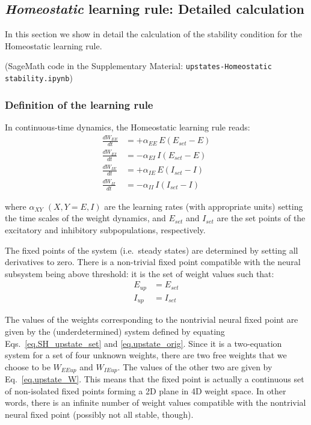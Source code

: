 \documentclass[twocolumn]{article}
\newcommand{\EE}{\mathit{EE}}
\newcommand{\EI}{\mathit{EI}}
\newcommand{\IE}{\mathit{IE}}
\newcommand{\II}{\mathit{II}}
\newcommand{\XY}{\mathit{XY}}
\newcommand{\set}{\mathit{set}}
\newcommand{\up}{\mathit{up}}
\begin{document}
\subsection{{\em Homeostatic} learning rule: Detailed calculation}
\label{sec.SH_details}

In this section we show in detail the calculation of the stability condition for the Homeostatic learning rule.

(SageMath code in the Supplementary Material: {\tt upstates-Homeostatic stability.ipynb})


\subsubsection{Definition of the learning rule}

In continuous-time dynamics, the Homeostatic learning rule reads:
\begin{equation}
\begin{aligned}
\frac{dW_{\EE}}{dt} & = +\alpha_{\EE} \, E (E_{\set} - E) \\
\frac{dW_{\EI}}{dt} & = -\alpha_{\EI} \, I (E_{\set} - E) \\
\frac{dW_{\IE}}{dt} & = +\alpha_{\IE} \, E (I_{\set} - I) \\
\frac{dW_{\II}}{dt} & = -\alpha_{\II} \, I (I_{\set} - I)
\end{aligned}
\label{eq.SH_equation}
\end{equation}

\noindent where $\alpha_{\XY}$ $(X,Y=E,I)$ are the learning rates (with appropriate units) setting the time scales of the weight dynamics, and $E_{\set}$ and $I_{\set}$ are the set points of the excitatory and inhibitory subpopulations, respectively.

The fixed points of the system (i.e.\ steady states) are determined by setting all derivatives to zero. There is a non-trivial fixed point compatible with the neural subsystem being above threshold: it is the set of weight values such that:
\begin{equation}
\begin{aligned}
E_{\up} & = E_{\set} \\
I_{\up} & = I_{\set}
\end{aligned}
\label{eq.SH_upstate_set}
\end{equation}

\noindent The values of the weights corresponding to the nontrivial neural fixed point are given by the (underdetermined) system defined by equating Eqs.\ \ref{eq.SH_upstate_set} and \ref{eq.upstate_orig}. Since it is a two-equation system for a set of four unknown weights, there are two free weights that we choose to be $W_{\EE\up}$ and $W_{\IE\up}$. The values of the other two are given by Eq.\ \ref{eq.upstate_W}. This means that the fixed point is actually a continuous set of non-isolated fixed points forming a 2D plane in 4D weight space. In other words, there is an infinite number of weight values compatible with the nontrivial neural fixed point (possibly not all stable, though).
\end{document}

